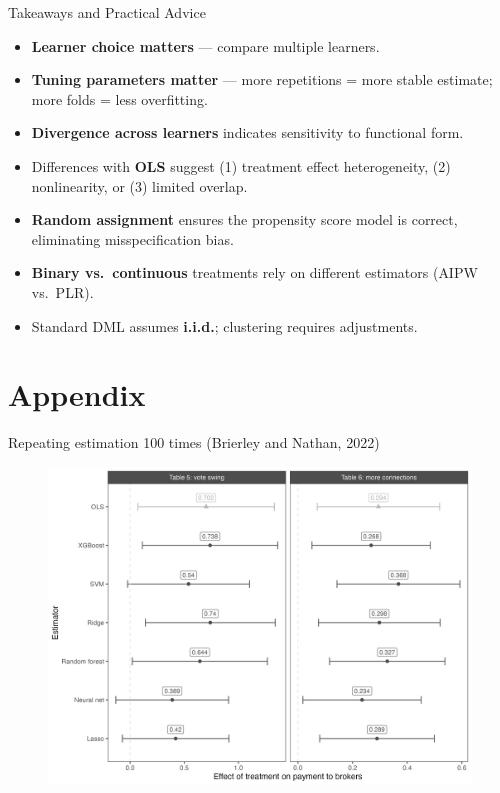 \documentclass[10pt,table,aspectratio=169]{beamer}
\begin{document}
\begin{frame}[plain, label = two_dimensions]{Takeaways and Practical Advice}

\begin{itemize}
  \item \alert{\bf Learner choice matters} --- compare multiple learners.  \medskip \pause
    \item \alert{\bf Tuning parameters matter} --- more repetitions = more stable estimate; more folds = less overfitting.  \medskip \pause
  \item \alert{\bf Divergence across learners} indicates sensitivity to functional form.   \medskip \pause
  \item Differences with \alert{\bf OLS} suggest (1) \alert{treatment effect heterogeneity}, (2) \alert{nonlinearity}, or (3) \alert{limited overlap}.  \medskip \pause
  \item \alert{\bf Random assignment} ensures the propensity score model is correct, eliminating \alert{misspecification bias}. \medskip \pause
  \item \alert{\bf Binary vs.\ continuous} treatments rely on different estimators (\alert{AIPW} vs.\ \alert{PLR}).  \medskip \pause
  \item Standard DML assumes \alert{\bf i.i.d.}; clustering requires adjustments.  
 
\end{itemize}

\end{frame}



\section{Appendix}

\begin{frame}[plain, label = two_dimensions]{Repeating estimation 100 times (Brierley and Nathan, 2022)}

\begin{figure}[H]
  \centering
  \includegraphics[height=0.9\textheight]{figures/observational_coefplot_dml.png}
\end{figure}
\end{frame}
\end{document}
